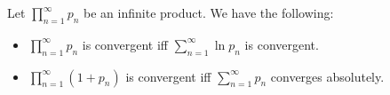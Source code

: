 \documentclass[12pt]{article}
\begin{document}
Let $\prod_{n=1}^{\infty}p_n$ be an infinite product. We have the
following:
\begin{itemize}
\item $\prod_{n=1}^{\infty}p_n$ is convergent iff
$\sum_{n=1}^{\infty}\ln{p_n}$ is convergent.

\item $\prod_{n=1}^{\infty}(1+p_n)$ is convergent iff
$\sum_{n=1}^{\infty}p_n$ converges absolutely.
\end{itemize}
\end{document}
